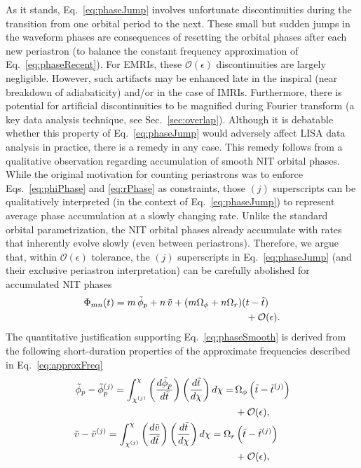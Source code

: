 \documentclass[aps,prd,twocolumn,showpacs,notitlepage,eqsecnum,
superscriptaddress,nofootinbib]{revtex4-1}
\begin{document}
As it stands, Eq.~\eqref{eq:phaseJump} involves unfortunate discontinuities during the transition from one orbital period to the next. These small but sudden jumps in the waveform phases are consequences of resetting the orbital phases after each new periastron (to balance the constant frequency approximation of Eq.~\eqref{eq:phaseRecent}). For EMRIs, these $\mathcal{O}(\epsilon)$ discontinuities are largely negligible. However, such artifacts may be enhanced late in the inspiral (near breakdown of adiabaticity) and/or in the case of IMRIs. Furthermore, there is potential for artificial discontinuities to be magnified during Fourier transform (a key data analysis technique, see Sec.~\ref{sec:overlap}). Although it is debatable whether this property of Eq.~\eqref{eq:phaseJump} would adversely affect LISA data analysis in practice, there is a remedy in any case. This remedy follows from a qualitative observation regarding accumulation of smooth NIT orbital phases. While the original motivation for counting periastrons was to enforce Eqs.~\eqref{eq:phiPhase} and \eqref{eq:rPhase} as constraints, those $(j)$ superscripts can be qualitatively interpreted (in the context of Eq.~\eqref{eq:phaseJump}) to represent average phase accumulation at a slowly changing rate. Unlike the standard orbital parametrization, the NIT orbital phases already accumulate with rates that inherently evolve slowly (even between periastrons). Therefore, we argue that, within $\mathcal{O}(\epsilon)$ tolerance, the $(j)$ superscripts in Eq.~\eqref{eq:phaseJump} (and their exclusive periastron interpretation) can be carefully abolished for accumulated NIT phases
\begin{align}
\Phi_{mn}(t) = m\, \tilde{\phi}_p  + n\, \tilde{v} + (m\Omega_\phi + n \Omega_r)(&t-\tilde{t}) \notag
\\&+ \mathcal{O}(\epsilon) .
\label{eq:phaseSmooth}
\end{align}
The quantitative justification supporting Eq.~\eqref{eq:phaseSmooth} is derived from the following short-duration properties of the approximate frequencies described in Eq.~\eqref{eq:approxFreq}
\begin{align}
\tilde{\phi}_p - \tilde{\phi}^{(j)}_p  =  \int_{\chi^{(j)}}^{\chi} \left(\frac{d\tilde{\phi}_p}{d\tilde{t}}\right)\left(\frac{d\tilde{t}}{d\chi}\right) d\chi = \, &\Omega_\phi \left(\tilde{t} - \tilde{t}^{(j)}\right) \notag
\\& + \mathcal{O}(\epsilon) ,
\\
\tilde{v} - \tilde{v}^{(j)}  =  \int_{\chi^{(j)}}^{\chi} \left(\frac{d\tilde{v}}{d\tilde{t}}\right)\left(\frac{d\tilde{t}}{d\chi}\right) d\chi = \Omega_r & \left(\tilde{t} - \tilde{t}^{(j)}\right) \notag
\\&  + \mathcal{O}(\epsilon) ,
\end{align}
\end{document}
